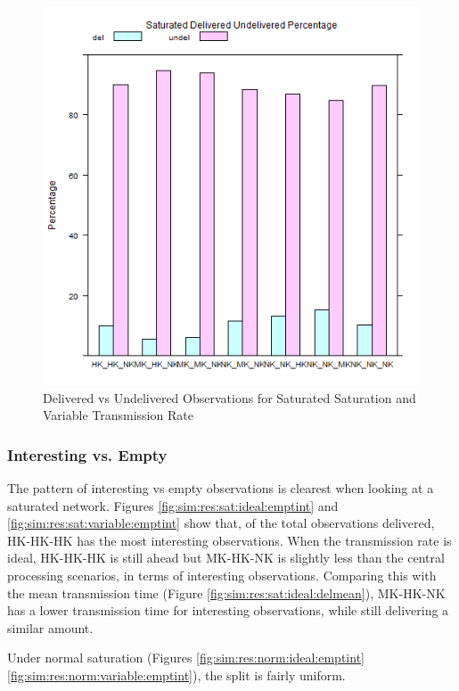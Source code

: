 	\begin{figure}[H]
	\centering
	\includegraphics[width=\textwidth]{Chap7/figures/plots/saturated_variable/delvsundel_percent.png}
	\caption{Delivered vs Undelivered Observations for Saturated Saturation and Variable Transmission Rate}
	\label{fig:sim:res:sat:variable:delundel}
	\end{figure}

\subsubsection{Interesting vs. Empty}
	The pattern of interesting vs empty observations is clearest when looking at a saturated network. Figures \ref{fig:sim:res:sat:ideal:emptint} and \ref{fig:sim:res:sat:variable:emptint} show that, of the total observations delivered, HK-HK-HK has the most interesting observations. When the transmission rate is ideal, HK-HK-HK is still ahead but MK-HK-NK is slightly less than the central processing scenarios, in terms of interesting observations. Comparing this with the mean transmission time (Figure \ref{fig:sim:res:sat:ideal:delmean}), MK-HK-NK has a lower transmission time for interesting observations, while still delivering a similar amount.

	Under normal saturation (Figures \ref{fig:sim:res:norm:ideal:emptint}\ref{fig:sim:res:norm:variable:emptint}), the split is fairly uniform. 


